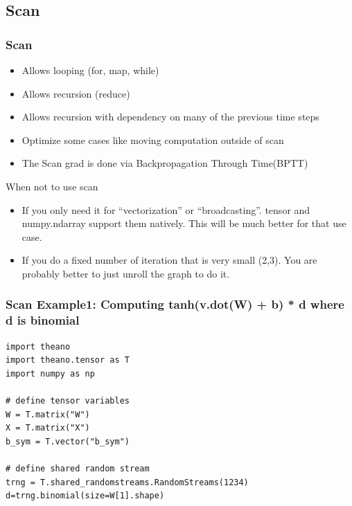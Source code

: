 \documentclass[utf8x,xcolor=pdftex,dvipsnames,table]{beamer}
\begin{document}
\iffalse
\subsection{Scan}
\begin{frame}
  \frametitle{Scan}
\begin{itemize}
\item Allows looping (for, map, while)
\item Allows recursion (reduce)
\item Allows recursion with dependency on many of the previous time steps
\item Optimize some cases like moving computation outside of scan
\item The Scan grad is done via Backpropagation Through Time(BPTT)
\end{itemize}
\end{frame}

\begin{frame}{When not to use scan}
\begin{itemize}
\item If you only need it for ``vectorization'' or
  ``broadcasting''. tensor and numpy.ndarray support them
  natively. This will be much better for that use case.

\item If you do a fixed number of iteration that is very small (2,3). You
  are probably better to just unroll the graph to do it.

\end{itemize}
\end{frame}


\begin{frame}
  \frametitle{Scan Example1: Computing tanh(v.dot(W) + b) * d where d is binomial}

\begin{lstlisting}
import theano
import theano.tensor as T
import numpy as np

# define tensor variables
W = T.matrix("W")
X = T.matrix("X")
b_sym = T.vector("b_sym")

# define shared random stream
trng = T.shared_randomstreams.RandomStreams(1234)
d=trng.binomial(size=W[1].shape)
\end{lstlisting}
\end{frame}
\end{document}
